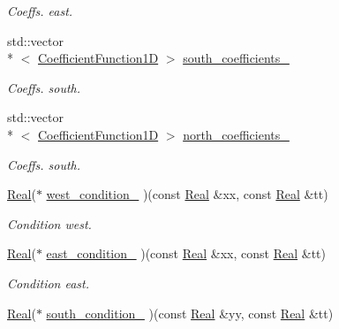 \begin{DoxyCompactItemize}
\begin{DoxyCompactList}\small\item\em Coeffs. east. \end{DoxyCompactList}\item 
std\+::vector\\*
$<$ \hyperlink{group__c07-mim__ops_gaa79593eeb6676d6011db339e01983909}{Coefficient\+Function1\+D} $>$ \hyperlink{classmtk_1_1RobinBCDescriptor2D_a97335ce1103cb89ab0696d5ae2fc6d37}{south\+\_\+coefficients\+\_\+}
\begin{DoxyCompactList}\small\item\em Coeffs. south. \end{DoxyCompactList}\item 
std\+::vector\\*
$<$ \hyperlink{group__c07-mim__ops_gaa79593eeb6676d6011db339e01983909}{Coefficient\+Function1\+D} $>$ \hyperlink{classmtk_1_1RobinBCDescriptor2D_a91fc1a7322ceda8f5409e1fe6490861c}{north\+\_\+coefficients\+\_\+}
\begin{DoxyCompactList}\small\item\em Coeffs. south. \end{DoxyCompactList}\item 
\hyperlink{group__c01-roots_gac080bbbf5cbb5502c9f00405f894857d}{Real}($\ast$ \hyperlink{classmtk_1_1RobinBCDescriptor2D_a3d04c776a3fa34cf4fea7c484e2056d6}{west\+\_\+condition\+\_\+} )(const \hyperlink{group__c01-roots_gac080bbbf5cbb5502c9f00405f894857d}{Real} \&xx, const \hyperlink{group__c01-roots_gac080bbbf5cbb5502c9f00405f894857d}{Real} \&tt)
\begin{DoxyCompactList}\small\item\em Condition west. \end{DoxyCompactList}\item 
\hyperlink{group__c01-roots_gac080bbbf5cbb5502c9f00405f894857d}{Real}($\ast$ \hyperlink{classmtk_1_1RobinBCDescriptor2D_a9b2b901adfa258a8e05788857de31c8a}{east\+\_\+condition\+\_\+} )(const \hyperlink{group__c01-roots_gac080bbbf5cbb5502c9f00405f894857d}{Real} \&xx, const \hyperlink{group__c01-roots_gac080bbbf5cbb5502c9f00405f894857d}{Real} \&tt)
\begin{DoxyCompactList}\small\item\em Condition east. \end{DoxyCompactList}\item 
\hyperlink{group__c01-roots_gac080bbbf5cbb5502c9f00405f894857d}{Real}($\ast$ \hyperlink{classmtk_1_1RobinBCDescriptor2D_aa45a1867ab80b81966f4221bbdb576ff}{south\+\_\+condition\+\_\+} )(const \hyperlink{group__c01-roots_gac080bbbf5cbb5502c9f00405f894857d}{Real} \&yy, const \hyperlink{group__c01-roots_gac080bbbf5cbb5502c9f00405f894857d}{Real} \&tt)

\end{DoxyCompactItemize}
